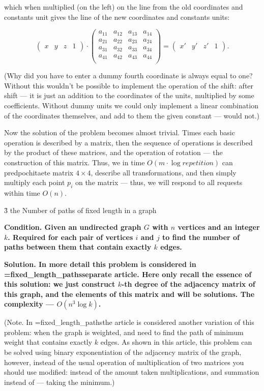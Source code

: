which when multiplied (on the left) on the line from the old coordinates and constants unit gives the line of the new coordinates and constants units:

$$ \begin{pmatrix} x & y & z & 1 \end{pmatrix} \cdot \begin{pmatrix}
a_{11} & a_{12} & a_{13} & a_{14} \\
a_{21} & a_{22} & a_{23} & a_{24} \\
a_{31} & a_{32} & a_{33} & a_{34} \\
a_{41} & a_{42} & a_{43} & a_{44} \\
\end{pmatrix} = \begin{pmatrix} x' & y' & z' & 1 \end{pmatrix}. $$

(Why did you have to enter a dummy fourth coordinate is always equal to one? Without this wouldn't be possible to implement the operation of the shift: after shift --- it is just an addition to the coordinates of the units, multiplied by some coefficients. Without dummy units we could only implement a linear combination of the coordinates themselves, and add to them the given constant --- would not.)

Now the solution of the problem becomes almost trivial. Times each basic operation is described by a matrix, then the sequence of operations is described by the product of these matrices, and the operation of rotation --- the construction of this matrix. Thus, we in time $O (m \cdot \log repetition)$ can predpochitaete matrix $4 \times 4$, describe all transformations, and then simply multiply each point $p_i$ on the matrix --- thus, we will respond to all requests within time $O (n)$.


\h3{ the Number of paths of fixed length in a graph }

\bf{Condition}. Given an undirected graph $G$ with $n$ vertices and an integer $k$. Required for each pair of vertices $i$ and $j$ to find the number of paths between them that contain exactly $k$ edges.

\bf{Solution}. In more detail this problem is considered in \algohref=fixed_length_paths{separate article}. Here only recall the essence of this solution: we just construct $k$-th degree of the adjacency matrix of this graph, and the elements of this matrix and will be solutions. The complexity --- $O (n^3 \log k)$.

(Note. In \algohref=fixed_length_paths{the article} is considered another variation of this problem: when the graph is weighted, and need to find the path of minimum weight that contains exactly $k$ edges. As shown in this article, this problem can be solved using binary exponentiation of the adjacency matrix of the graph, however, instead of the usual operation of multiplication of two matrices you should use modified: instead of the amount taken multiplications, and summation instead of --- taking the minimum.)



